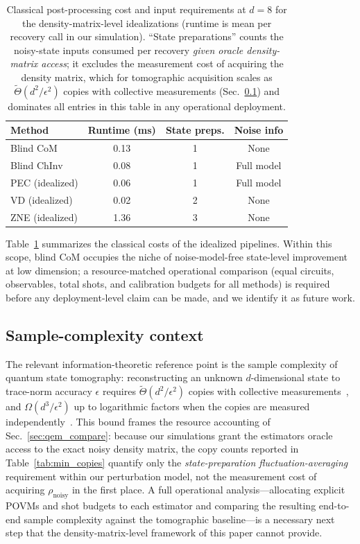 \documentclass[pra,twocolumn,superscriptaddress,longbibliography,floatfix,nofootinbib]{revtex4-2}
\newcommand{\rhon}{\rho_\mathrm{noisy}}
\begin{document}
\begin{table}[!tb]
\caption{Classical post-processing cost and input requirements at $d = 8$ for the density-matrix-level idealizations (runtime is mean per recovery call in our simulation).
``State preparations'' counts the noisy-state inputs consumed per recovery \emph{given oracle density-matrix access}; it excludes the measurement cost of acquiring the density matrix, which for tomographic acquisition scales as $\tilde\Theta(d^2/\epsilon^2)$ copies with collective measurements (Sec.~\ref{sec:sample_complexity}) and dominates all entries in this table in any operational deployment.}
\label{tab:overhead}

\begin{tabular}{lccc}
Method & Runtime (ms) & State preps. & Noise info \\
\hline
Blind CoM      & 0.13 & 1 & None \\
Blind ChInv    & 0.08 & 1 & Full model \\
PEC (idealized) & 0.06 & 1 & Full model \\
VD (idealized)  & 0.02 & 2 & None \\
ZNE (idealized) & 1.36 & 3 & None \\
\end{tabular}

\end{table}

Table~\ref{tab:overhead} summarizes the classical costs of the idealized pipelines.
Within this scope, blind CoM occupies the niche of noise-model-free state-level improvement at low dimension; a resource-matched operational comparison (equal circuits, observables, total shots, and calibration budgets for all methods) is required before any deployment-level claim can be made, and we identify it as future work.


\subsection{Sample-complexity context}
\label{sec:sample_complexity}

The relevant information-theoretic reference point is the sample complexity of quantum state tomography: reconstructing an unknown $d$-dimensional state to trace-norm accuracy $\epsilon$ requires $\tilde\Theta(d^2/\epsilon^2)$ copies with collective measurements~\cite{Haah2017,ODonnellWright2016}, and $\Omega(d^3/\epsilon^2)$ up to logarithmic factors when the copies are measured independently~\cite{Haah2017}.
This bound frames the resource accounting of Sec.~\ref{sec:qem_compare}: because our simulations grant the estimators oracle access to the exact noisy density matrix, the copy counts reported in Table~\ref{tab:min_copies} quantify only the \emph{state-preparation fluctuation-averaging} requirement within our perturbation model, not the measurement cost of acquiring $\rhon$ in the first place.
A full operational analysis---allocating explicit POVMs and shot budgets to each estimator and comparing the resulting end-to-end sample complexity against the tomographic baseline---is a necessary next step that the density-matrix-level framework of this paper cannot provide.
\end{document}

